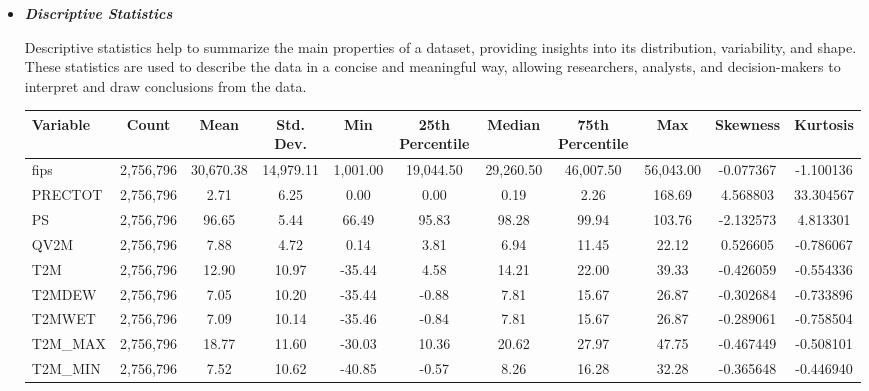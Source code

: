\documentclass{article}
\begin{document}
\begin{itemize}
    \item \textit{\textbf{{Discriptive Statistics}}}

            Descriptive statistics help to summarize the main properties of a dataset, providing insights into its distribution, variability, and shape. These statistics are used to describe the data in a concise and meaningful way, allowing researchers, analysts, and decision-makers to interpret and draw conclusions from the data.
            \FloatBarrier
            \begin{table}[htbp]
            \centering
            \small
            \setlength{\tabcolsep}{3pt}
            \renewcommand{\arraystretch}{1.2}
            \begin{adjustbox}{width=\textwidth}
            \begin{tabular}{|l|c|c|c|c|c|c|c|c|c|c|}
            \hline
            \textbf{Variable} & \textbf{Count} & \textbf{Mean} & \textbf{Std. Dev.} & \textbf{Min} & \textbf{25th Percentile} & \textbf{Median} & \textbf{75th Percentile} & \textbf{Max} & \textbf{Skewness} & \textbf{Kurtosis} \\ \hline
            fips & 2,756,796 & 30,670.38 & 14,979.11 & 1,001.00 & 19,044.50 & 29,260.50 & 46,007.50 & 56,043.00 & -0.077367 & -1.100136 \\ \hline
            PRECTOT & 2,756,796 & 2.71 & 6.25 & 0.00 & 0.00 & 0.19 & 2.26 & 168.69 & 4.568803 & 33.304567 \\ \hline
            PS & 2,756,796 & 96.65 & 5.44 & 66.49 & 95.83 & 98.28 & 99.94 & 103.76 & -2.132573 & 4.813301 \\ \hline
            QV2M & 2,756,796 & 7.88 & 4.72 & 0.14 & 3.81 & 6.94 & 11.45 & 22.12 & 0.526605 & -0.786067 \\ \hline
            T2M & 2,756,796 & 12.90 & 10.97 & -35.44 & 4.58 & 14.21 & 22.00 & 39.33 & -0.426059 & -0.554336 \\ \hline
            T2MDEW & 2,756,796 & 7.05 & 10.20 & -35.44 & -0.88 & 7.81 & 15.67 & 26.87 & -0.302684 & -0.733896 \\ \hline
            T2MWET & 2,756,796 & 7.09 & 10.14 & -35.46 & -0.84 & 7.81 & 15.67 & 26.87 & -0.289061 & -0.758504 \\ \hline
            T2M\_MAX & 2,756,796 & 18.77 & 11.60 & -30.03 & 10.36 & 20.62 & 27.97 & 47.75 & -0.467449 & -0.508101 \\ \hline
            T2M\_MIN & 2,756,796 & 7.52 & 10.62 & -40.85 & -0.57 & 8.26 & 16.28 & 32.28 & -0.365648 & -0.446940 \\ \hline

\end{tabular}
\end{adjustbox}
\end{table}
\end{itemize}
\end{document}
